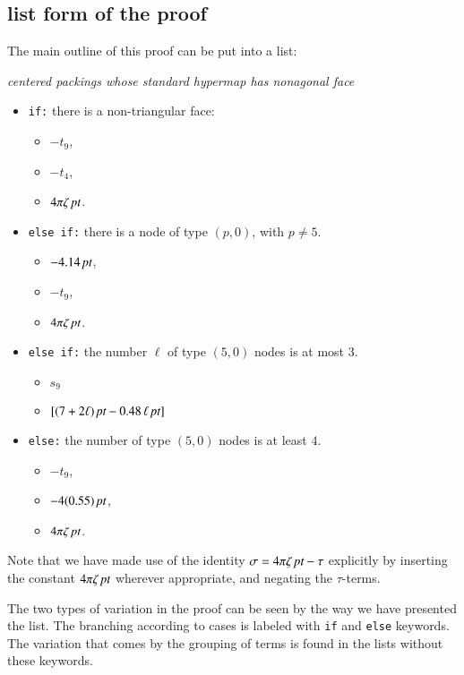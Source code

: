 \subsection{list form of the proof}

The main outline of this proof can be put into a list:
\bigskip

\centerline{\it centered packings whose standard hypermap has nonagonal face\hss}

\begin{itemize}
\item {\tt if:} there is a non-triangular face:
\begin{itemize}
\item $-t_9$,
\item $-t_4$,
\item $4\pi\zeta\,\hbox{\it pt}$.
\end{itemize}
\item {\tt else if:} there is a node of type $(p,0)$, with $p\ne 5$.
\begin{itemize}
\item $-4.14\,\hbox{\it pt}$,
\item $-t_9$,
\item $4\pi\zeta\,\hbox{\it pt}$.
\end{itemize}
\item {\tt else if:} the number $\ell$ of type $(5,0)$ nodes is at most $3$.
\begin{itemize}
\item $s_9$
\item $[(7+2\ell)\,\hbox{\it pt} - 0.48\,\ell\,\hbox{\it pt}]$
\end{itemize}
\item {\tt else:} the number of type $(5,0)$ nodes is at least $4$.
\begin{itemize}
\item $-t_9$,
\item $-4(0.55)\,\hbox{\it pt}$,
\item $4\pi\zeta\,\hbox{\it pt}$.
\end{itemize}
\end{itemize}

Note that we have made use of the identity
$\sigma = 4\pi\zeta\,\hbox{\it pt} - \tau$
explicitly by inserting the constant $4\pi\zeta\,\hbox{\it pt}$ wherever
appropriate, and negating the $\tau$-terms.

The two types of variation in the proof can be seen by the way
we have presented the list.  The branching according to cases
is labeled with {\tt if} and {\tt else} keywords.  The variation
that comes by the grouping of terms is found in the lists without
these keywords.  

